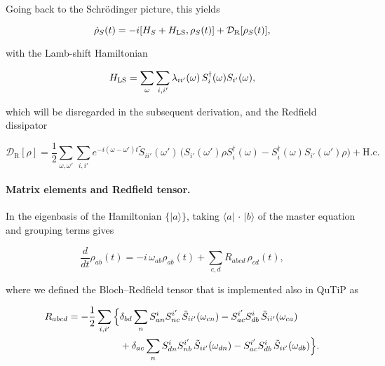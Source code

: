 \noindent
Going back to the Schrödinger picture, this yields

\begin{equation}
\dot{\rho}_S(t)=-i[H_S+H_{\rm LS},\rho_S(t)]+\mathcal{D}_\mathrm{R}[\rho_S(t)],
\end{equation}

\noindent
with the Lamb-shift Hamiltonian

\begin{equation}
	H_{\rm LS}=\sum_{\omega}\sum_{i, i'}\lambda_{ii'}(\omega)\,
	S_i^\dagger(\omega)S_{i'}(\omega),
	\label{eq:Lamb_Shift_Hamiltonian}
\end{equation}

\noindent
which will be disregarded in the subsequent derivation, and the Redfield dissipator

\begin{equation}
	\mathcal{D}_\mathrm{R}[\rho]
	=\frac{1}{2}\sum_{\omega,\omega'}\sum_{i, i'}
	e^{-i(\omega-\omega')t} \tilde{S}_{ii'}(\omega')\,
	\Big(
		S_{i'}(\omega')\rho S_i^\dagger(\omega)
		- S_i^\dagger(\omega)S_{i'}(\omega')\rho
	\Big) + \text{H.c.}
	\label{eq:Redfield_Dissipator}
\end{equation}


\paragraph{Matrix elements and Redfield tensor.}

\noindent
In the eigenbasis of the Hamiltonian $\{|a\rangle\}$, taking $\langle a|\,\cdot\,|b\rangle$ of the master equation and grouping terms gives

\begin{equation}
\frac{d}{dt}\rho_{ab}(t)
= -i\,\omega_{ab}\rho_{ab}(t) + \sum_{c,d} R_{abcd}\,\rho_{cd}(t),
\label{eq:bloch_redfield_basis}
\end{equation}

\noindent
where we defined the Bloch–Redfield tensor that is implemented also in QuTiP as

\begin{align}
R_{abcd}
= -\frac{1}{2} \sum_{i, i'}\Big\{&
\delta_{bd}\sum_n S^{i}_{an}S^{i'}_{nc}\,\tilde{S}_{ii'}(\omega_{cn})
- S^{i'}_{ac}S^{i}_{db}\,\tilde{S}_{ii'}(\omega_{ca})
\notag\\
&+\delta_{ac}\sum_n S^{i}_{dn}S^{i'}_{nb}\,\tilde{S}_{ii'}(\omega_{dn})
- S^{i'}_{ac}S^{i}_{db}\,\tilde{S}_{ii'}(\omega_{db})
\Big\}.
\label{eq:Rabcd_full}
\end{align}


